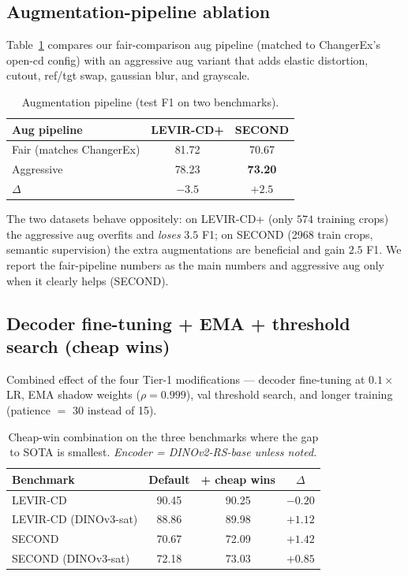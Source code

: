 \subsection{Augmentation-pipeline ablation}

Table~\ref{tab:aug-ablation} compares our fair-comparison aug pipeline
(matched to ChangerEx's open-cd config) with an aggressive aug variant
that adds elastic distortion, cutout, ref/tgt swap, gaussian blur, and
grayscale.

\begin{table}[h]
  \centering
  \small
  \caption{Augmentation pipeline (test F1 on two benchmarks).}
  \label{tab:aug-ablation}
  \begin{tabular}{lcc}
    \toprule
    Aug pipeline                & LEVIR-CD+ & SECOND \\
    \midrule
    Fair (matches ChangerEx)    & 81.72 & 70.67 \\
    Aggressive                  & 78.23 & \textbf{73.20} \\
    $\Delta$                    & $-3.5$ & $+2.5$ \\
    \bottomrule
  \end{tabular}
\end{table}

The two datasets behave oppositely: on LEVIR-CD+ (only $574$ training
crops) the aggressive aug overfits and \emph{loses} $3.5$ F1; on SECOND
(2968 train crops, semantic supervision) the extra augmentations are
beneficial and gain $2.5$ F1. We report the fair-pipeline numbers as the
main numbers and aggressive aug only when it clearly helps (SECOND).

\subsection{Decoder fine-tuning + EMA + threshold search (cheap wins)}
\label{sec:cheap-wins-2}

Combined effect of the four Tier-1 modifications --- decoder fine-tuning
at $0.1\times$ LR, EMA shadow weights ($\rho{=}0.999$), val threshold
search, and longer training (patience $=$ 30 instead of 15).

\begin{table}[h]
  \centering
  \small
  \caption{Cheap-win combination on the three benchmarks where the gap
    to SOTA is smallest. \emph{Encoder = DINOv2-RS-base unless noted.}}
  \label{tab:cheap-combo}
  \begin{tabular}{lccc}
    \toprule
    Benchmark & Default & + cheap wins & $\Delta$ \\
    \midrule
    LEVIR-CD            & 90.45 & 90.25 & $-0.20$ \\
    LEVIR-CD (DINOv3-sat) & 88.86 & 89.98 & $+1.12$ \\
    SECOND              & 70.67 & 72.09 & $+1.42$ \\
    SECOND (DINOv3-sat) & 72.18 & 73.03 & $+0.85$ \\
    \bottomrule
  \end{tabular}
\end{table}

